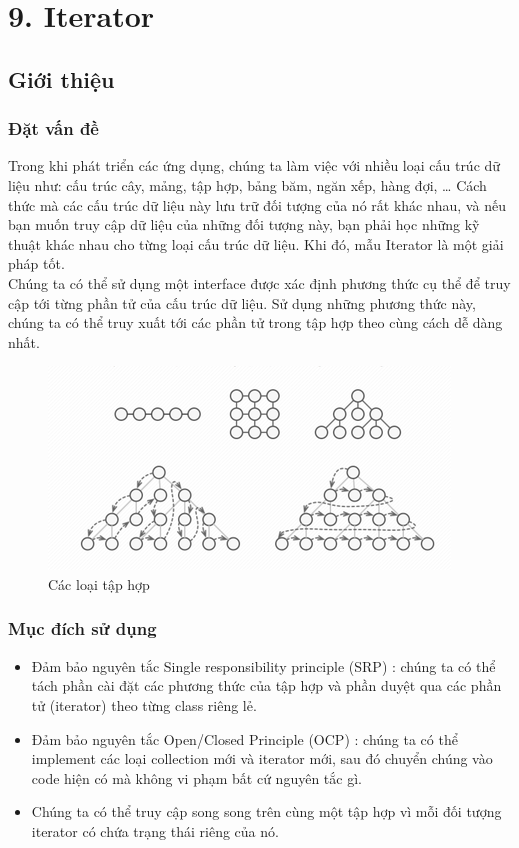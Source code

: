 \chapter{9. Iterator}
\section{Giới thiệu}
\subsection{Đặt vấn đề}
Trong khi phát triển các ứng dụng, chúng ta làm việc với nhiều loại cấu trúc dữ liệu như: cấu trúc cây, mảng, tập hợp, bảng băm, ngăn xếp, hàng đợi, … Cách thức mà các cấu trúc dữ liệu này lưu trữ đối tượng của nó rất khác nhau, và nếu bạn muốn truy cập dữ liệu của những đối tượng này, bạn phải học những kỹ thuật khác nhau cho từng loại cấu trúc dữ liệu. Khi đó, mẫu Iterator là một giải pháp tốt.\\
Chúng ta có thể sử dụng một interface được xác định phương thức cụ thể để truy cập tới từng phần tử của cấu trúc dữ liệu. Sử dụng những phương thức này, chúng ta có thể truy xuất tới các phần tử trong tập hợp theo cùng cách dễ dàng nhất.

\begin{figure}[!htb]
    \centering
    \includegraphics[width=\textwidth]{fig/Iterator/iterator_problem.png}
    \caption{Các loại tập hợp}
    \label{fig:iterator_problem}
\end{figure}

\subsection{Mục đích sử dụng}
\begin{itemize}
    \item Đảm bảo nguyên tắc Single responsibility principle (SRP) : chúng ta có thể tách phần cài đặt các phương thức của tập hợp và phần duyệt qua các phần tử (iterator) theo từng class riêng lẻ.
    \item Đảm bảo nguyên tắc Open/Closed Principle (OCP) : chúng ta có thể implement các loại collection mới và iterator mới, sau đó chuyển chúng vào code hiện có mà không vi phạm bất cứ nguyên tắc gì.
    \item Chúng ta có thể truy cập song song trên cùng một tập hợp vì mỗi đối tượng iterator có chứa trạng thái riêng của nó.
\end{itemize}


